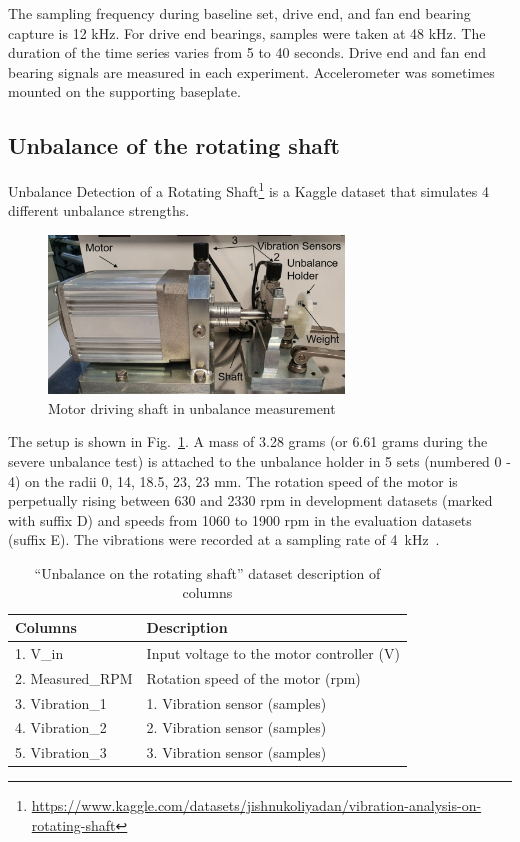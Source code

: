 The sampling frequency during baseline set, drive end, and fan end bearing capture is 12 kHz. For drive end bearings, samples were taken at 48 kHz. The duration of the time series varies from 5 to 40 seconds. Drive end and fan end bearing signals are measured in each experiment. Accelerometer was sometimes mounted on the supporting baseplate.

\subsection{Unbalance of the rotating shaft}
Unbalance Detection of a Rotating Shaft\footnote{\url{https://www.kaggle.com/datasets/jishnukoliyadan/vibration-analysis-on-rotating-shaft}} is a Kaggle dataset that simulates 4 different unbalance strengths. 
\begin{figure}[h]
\centering
\includegraphics[width=0.7\textwidth]{assets/analysis/rotating-shaft.jpg}
\caption{Motor driving shaft in unbalance measurement \cite{mey_machine_2020}}
\label{fig:rotating-shaft}
\end{figure}

The setup is shown in Fig.~\ref{fig:rotating-shaft}. A mass of 3.28 grams (or 6.61 grams during the severe unbalance test) is attached to the unbalance holder in 5 sets (numbered 0 - 4) on the radii 0, 14, 18.5, 23, 23 mm. The rotation speed of the motor is perpetually rising between 630 and 2330 rpm in development datasets (marked with suffix D) and speeds from 1060 to 1900 rpm in the evaluation datasets (suffix E). The vibrations were recorded at a sampling rate of 4~kHz~\cite{mey_machine_2020}.

\begin{table}[h]
\centering
\renewcommand{\arraystretch}{1.2}
\begin{tabular}{|l|l|}
\hline
\textbf{Columns} & \textbf{Description}                      \\ \hline
1. V\_in         & Input voltage to the motor controller (V) \\ \hline
2. Measured\_RPM & Rotation speed of the motor (rpm)  \\ \hline
3. Vibration\_1  & 1. Vibration sensor (samples)             \\ \hline
4. Vibration\_2  & 2. Vibration sensor (samples)             \\ \hline
5. Vibration\_3  & 3. Vibration sensor (samples)             \\ \hline
\end{tabular}
\caption{``Unbalance on the rotating shaft'' dataset description of columns}
\end{table}

